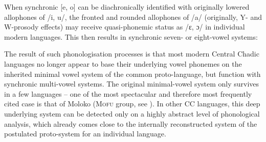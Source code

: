 \documentclass[output=paper]{langscibook}
\begin{document}
\begin{table}
\caption{After apparent phonologisation II: Prosody-induced tense mid vowels in modern CC languages}
\label{tab:wolff:11}
\end{table}

When synchronic [e, o] can be diachronically identified with originally lowered allophones of /i, u/, the fronted and rounded allophones of /a/ (originally, Y- and W-prosody effects) may receive quasi-phonemic status as /ε, ɔ/ in individual modern languages. This then results in synchronic seven- or eight-vowel systems:


\begin{table}
\caption{After phonologisation III: Prosody-induced lax mid vowels in modern CC languages}
\label{tab:wolff:12}
\end{table}

The result of such phonologisation processes is that most modern Central Chadic languages no longer appear to base their underlying vowel phonemes on the inherited minimal vowel system of the common proto-language, but function with synchronic multi-vowel systems. The original minimal-vowel system only survives in a few languages – one of the most spectacular and therefore most frequently cited case is that of Moloko (\textsc{Mofu} group, see \citealt{FriesenEtAl2017}). In other CC languages, this deep underlying system can be detected only on a highly abstract level of phonological analysis, which already comes close to the internally reconstructed system of the postulated proto-system for an individual language. 
\end{document}
